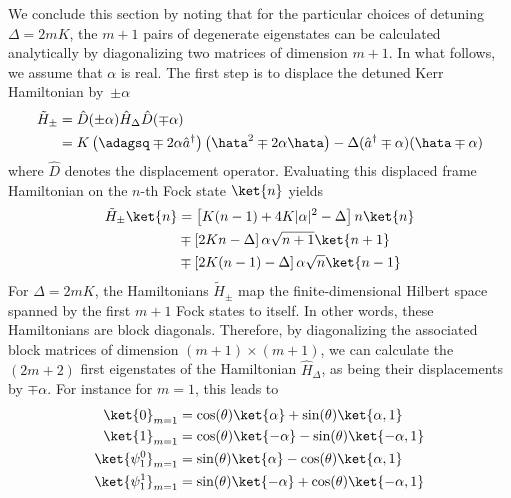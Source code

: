 We conclude this section by noting that for the particular choices of detuning $\Delta=2mK$, the $m +1$ pairs of degenerate eigenstates can be calculated analytically by diagonalizing two matrices of dimension $m+1$. In what follows, we assume that $\alpha$ is real. The first step is to displace the detuned Kerr Hamiltonian by~$\pm \alpha$
\begin{equation*}
    \begin{split}
        \tilde{H}_\pm &= \hat D(\pm \alpha) \hat{H}_\Delta \hat D(\mp \alpha) \\
         &= K \left( \adagsq \mp 2 \alpha \hat{a}^{\dagger} \right) \left( \hata^2 \mp 2 \alpha \hata \right) -  \Delta (\hat{a}^{\dagger} \mp\alpha)( \hata \mp \alpha)
    \end{split}
\end{equation*}
where $\hat D$ denotes the displacement operator. Evaluating this displaced frame Hamiltonian on the $n$-th Fock state $\ket{n}$ yields
\begin{equation}
    \begin{split}
        \tilde{H}_\pm \ket{n} & = \left[K (n-1) + 4 K |\alpha|^2 - \Delta \right] n \ket{n} \\ 
        & \mp \left[2K n - \Delta \right] \alpha \sqrt{n+1} \ket{n+1} \\
        & \mp \left[2K (n-1)  - \Delta \right] \alpha \sqrt{n} \ket{n-1}
    \end{split}
\end{equation}
For $\Delta = 2mK$, the Hamiltonians $\tilde H_\pm$ map the finite-dimensional Hilbert space spanned by the first $m+1$ Fock states to itself. In other words, these Hamiltonians are block diagonals. Therefore, by diagonalizing the associated block matrices of dimension $(m+1)\times(m+1)$, we can calculate the $(2m+2)$ first eigenstates of the Hamiltonian $\hat H_\Delta$, as being their displacements by $\mp\alpha$.  For instance for $m=1$, this leads to
\begin{equation*}
    \begin{split}
        \ket{0}_{m=1} &= \text{cos}(\theta)\ket{\alpha} + \text{sin}(\theta) \ket{\alpha,1} \\
        \ket{{1}}_{m=1} &= \text{cos}(\theta)\ket{-\alpha} - \text{sin}(\theta) \ket{-\alpha,1} \\
        \ket{\psi^0_{1}}_{m=1} &= \text{sin}(\theta)\ket{\alpha} - \text{cos}(\theta) \ket{\alpha,1} \\
        \ket{\psi^1_{1}}_{m=1} &= \text{sin}(\theta)\ket{-\alpha} + \text{cos}(\theta) \ket{-\alpha,1} \\
    \end{split}
\end{equation*}
